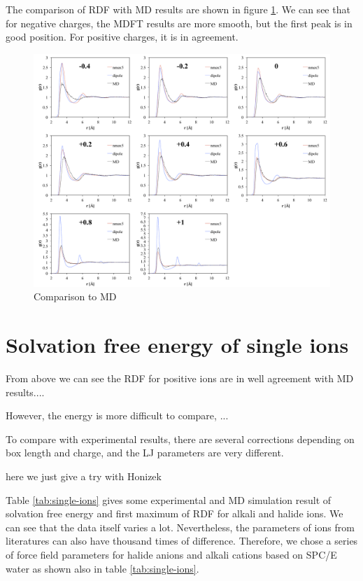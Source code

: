 The comparison of \acs{RDF} with \acs{MD} results are shown in figure
\ref{fig:Comparison-to-MD}. We can see that for negative charges,
the \acs{MDFT} results are more smooth, but the first peak is in
good position. For positive charges, it is in agreement.

\begin{figure}[h]
\begin{centering}
\includegraphics[width=1\columnwidth]{_figure/results/ch4_md}
\par\end{centering}
\caption{Comparison to MD\label{fig:Comparison-to-MD}}
\end{figure}


\section{Solvation free energy of single ions}

From above we can see the \acs{RDF} for positive ions are in well
agreement with \acs{MD} results....

However, the energy is more difficult to compare, ... 

To compare with experimental results, there are several corrections
depending on box length and charge, and the LJ parameters are very
different.

here we just give a try with Honizek 

Table \ref{tab:single-ions} gives some experimental and \acs{MD}
simulation result of solvation free energy and first maximum of \acs{RDF}
for alkali and halide ions. We can see that the data itself varies
a lot. Nevertheless, the parameters of ions from literatures can also
have thousand times of difference. Therefore, we chose a series of
force field parameters for halide anions and alkali cations based
on SPC/E water as shown also in table \ref{tab:single-ions}. 

